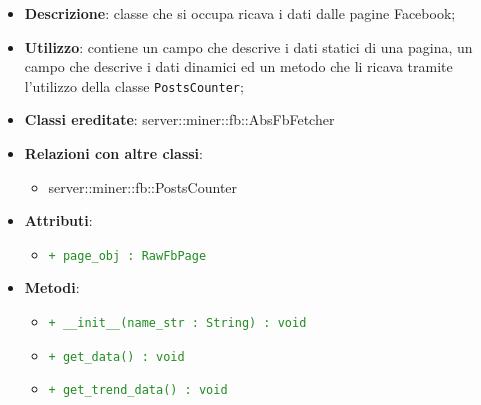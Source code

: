 			\begin{itemize}
				\item \textbf{Descrizione}: classe che si occupa ricava i dati dalle pagine Facebook;
				\item \textbf{Utilizzo}: contiene un campo che descrive i dati statici di una pagina, un campo che descrive i dati dinamici ed un metodo che li ricava tramite l'utilizzo della classe \texttt{PostsCounter};
				\item \textbf{Classi ereditate}: server::miner::fb::AbsFbFetcher
				\item \textbf{Relazioni con altre classi}:
					\begin{itemize}
						\item server::miner::fb::PostsCounter
					\end{itemize}
				\item \textbf{Attributi}: 
					\begin{itemize}
						\item \textcolor{forestgreen}{\texttt{+ page\_obj : RawFbPage}}
					\end{itemize}
				\item \textbf{Metodi}:   
					\begin{itemize}
						\item \textcolor{forestgreen}{\texttt{+ \_\_init\_\_(name\_str : String) : void}}
						\item \textcolor{forestgreen}{\texttt{+ get\_data() : void}}
						\item \textcolor{forestgreen}{\texttt{+ get\_trend\_data() : void}}

\end{itemize}
\end{itemize}
